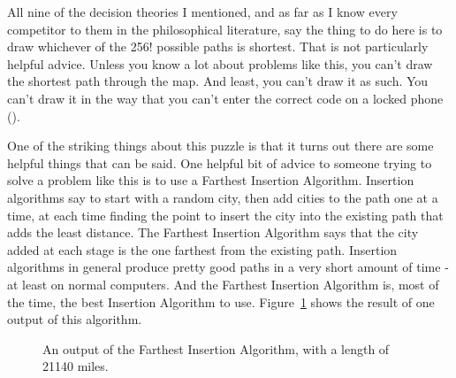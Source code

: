\documentclass[
  11pt,
  letterpaper,
  DIV=11,
  numbers=noendperiod,
  oneside]{scrartcl}
\begin{document}
All nine of the decision theories I mentioned, and as far as I know
every competitor to them in the philosophical literature, say the thing
to do here is to draw whichever of the 256! possible paths is shortest.
That is not particularly helpful advice. Unless you know a lot about
problems like this, you can't draw the shortest path through the map.
And least, you can't draw it as such. You can't draw it in the way that
you can't enter the correct code on a locked phone
().

One of the striking things about this puzzle is that it turns out there
are some helpful things that can be said. One helpful bit of advice to
someone trying to solve a problem like this is to use a Farthest
Insertion Algorithm. Insertion algorithms say to start with a random
city, then add cities to the path one at a time, at each time finding
the point to insert the city into the existing path that adds the least
distance. The Farthest Insertion Algorithm says that the city added at
each stage is the one farthest from the existing path. Insertion
algorithms in general produce pretty good paths in a very short amount
of time - at least on normal computers. And the Farthest Insertion
Algorithm is, most of the time, the best Insertion Algorithm to use.
Figure~\ref{fig-farthest} shows the result of one output of this
algorithm.

\begin{figure}


\caption{\label{fig-farthest}An output of the Farthest Insertion
Algorithm, with a length of 21140 miles.}

\end{figure}%
\end{document}
